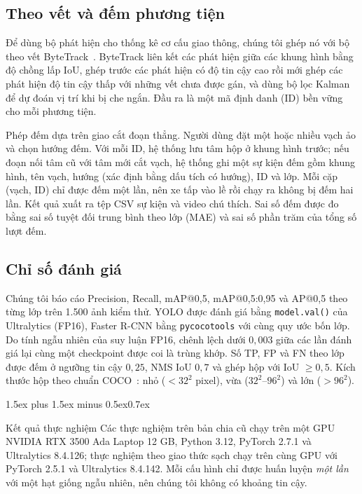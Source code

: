 \documentclass[10pt,journal,letterpaper]{IEEEtran}
\makeatletter
\renewcommand\section{\@startsection{section}{1}{\z@}%
  {1.5ex plus 1.5ex minus 0.5ex}{0.7ex}{\normalfont\scshape\raggedright}}
\makeatother
\begin{document}
\subsection{Theo vết và đếm phương tiện}
Để dùng bộ phát hiện cho thống kê cơ cấu giao thông, chúng tôi ghép nó với bộ theo vết ByteTrack~\cite{bytetrack}. ByteTrack liên kết các phát hiện giữa các khung hình bằng độ chồng lấp IoU, ghép trước các phát hiện có độ tin cậy cao rồi mới ghép các phát hiện độ tin cậy thấp với những vết chưa được gán, và dùng bộ lọc Kalman để dự đoán vị trí khi bị che ngắn. Đầu ra là một mã định danh (ID) bền vững cho mỗi phương tiện.

Phép đếm dựa trên giao cắt đoạn thẳng. Người dùng đặt một hoặc nhiều vạch ảo và chọn hướng đếm. Với mỗi ID, hệ thống lưu tâm hộp ở khung hình trước; nếu đoạn nối tâm cũ với tâm mới cắt vạch, hệ thống ghi một sự kiện đếm gồm khung hình, tên vạch, hướng (xác định bằng dấu tích có hướng), ID và lớp. Mỗi cặp (vạch, ID) chỉ được đếm một lần, nên xe tấp vào lề rồi chạy ra không bị đếm hai lần. Kết quả xuất ra tệp CSV sự kiện và video chú thích. Sai số đếm được đo bằng sai số tuyệt đối trung bình theo lớp (MAE) và sai số phần trăm của tổng số lượt đếm.

\subsection{Chỉ số đánh giá}
Chúng tôi báo cáo Precision, Recall, mAP@0,5, mAP@0,5:0,95 và AP@0,5 theo từng lớp trên 1.500 ảnh kiểm thử. YOLO được đánh giá bằng \texttt{model.val()} của Ultralytics (FP16), Faster R-CNN bằng \texttt{pycocotools} với cùng quy ước bốn lớp. Do tính ngẫu nhiên của suy luận FP16, chênh lệch dưới $0{,}003$ giữa các lần đánh giá lại cùng một checkpoint được coi là trùng khớp. Số TP, FP và FN theo lớp được đếm ở ngưỡng tin cậy $0{,}25$, NMS IoU $0{,}7$ và ghép hộp với IoU $\ge0{,}5$. Kích thước hộp theo chuẩn COCO~\cite{coco}: nhỏ ($<32^2$ pixel), vừa ($32^2$--$96^2$) và lớn ($>96^2$).

\section{Kết quả thực nghiệm}
Các thực nghiệm trên bản chia cũ chạy trên một GPU NVIDIA RTX 3500 Ada Laptop 12 GB, Python 3.12, PyTorch 2.7.1 và Ultralytics 8.4.126; thực nghiệm theo giao thức sạch chạy trên cùng GPU với PyTorch 2.5.1 và Ultralytics 8.4.142. Mỗi cấu hình chỉ được huấn luyện \emph{một lần} với một hạt giống ngẫu nhiên, nên chúng tôi không có khoảng tin cậy.
\end{document}
